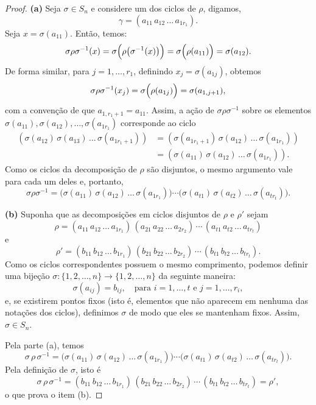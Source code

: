 \documentclass[11pt,openany]{book}
\begin{document}
\begin{proof}
    \textbf{(a)} Seja $\sigma\in S_n$ e considere um dos ciclos de $\rho$, digamos,
    \[
    \gamma=(a_{11}\,a_{12}\,\dots\,a_{1r_1}).
    \]
    Seja $x=\sigma(a_{11})$. Então, temos:
    \[
    \sigma\rho\sigma^{-1}(x)=\sigma\Bigl(\rho\bigl(\sigma^{-1}(x)\bigr)\Bigr)=\sigma\Bigl(\rho(a_{11})\Bigr)=\sigma(a_{12}).
    \]
    De forma similar, para $j=1,\dots,r_1$, definindo $x_j=\sigma(a_{1j})$, obtemos
    \[
    \sigma\rho\sigma^{-1}(x_j)=\sigma\Bigl(\rho(a_{1j})\Bigr)=\sigma(a_{1,j+1}),
    \]
    com a convenção de que $a_{1,r_1+1}=a_{11}$. Assim, a ação de $\sigma\rho\sigma^{-1}$ sobre os elementos $\sigma(a_{11}),\sigma(a_{12}),\dots,\sigma(a_{1r_1})$ corresponde ao ciclo
    \begin{align*}
    (\sigma(a_{12})\,\sigma(a_{13})\,\dots\,\sigma(a_{1r_1+1})) &= (\sigma(a_{1r_1+1})\, \sigma(a_{12})\,\dots\,\sigma(a_{1r_1})) \\
    &= (\sigma(a_{11})\,\sigma(a_{12})\,\dots\,\sigma(a_{1r_1})).
    \end{align*}
    Como os ciclos da decomposição de $\rho$ são disjuntos, o mesmo argumento vale para cada um deles e, portanto,
    \[
    \sigma\rho\sigma^{-1} = \bigl(\sigma(a_{11})\,\sigma(a_{12})\,\dots\,\sigma(a_{1r_1})\bigr)
    \cdots
    \bigl(\sigma(a_{t1})\,\sigma(a_{t2})\,\dots\,\sigma(a_{tr_t})\bigr).
    \]

    \bigskip

    \textbf{(b)} Suponha que as decomposições em ciclos disjuntos de $\rho$ e $\rho'$ sejam
    \[
    \rho = (a_{11}\,a_{12}\,\dots\,a_{1r_1})\,(a_{21}\,a_{22}\,\dots\,a_{2r_2})\,\cdots\,(a_{t1}\,a_{t2}\,\dots\,a_{tr_t})
    \]
    e
    \[
    \rho' = (b_{11}\,b_{12}\,\dots\,b_{1r_1})\,(b_{21}\,b_{22}\,\dots\,b_{2r_2})\,\cdots\,(b_{t1}\,b_{t2}\,\dots\,b_{tr_t}).
    \]
    Como os ciclos correspondentes possuem o mesmo comprimento, podemos definir uma bijeção $\sigma:\{1,2,\dots,n\}\to\{1,2,\dots,n\}$ da seguinte maneira:
    \[
    \sigma(a_{ij})=b_{ij},\quad \text{para } i=1,\dots,t \text{ e } j=1,\dots,r_i,
    \]
    e, se existirem pontos fixos (isto é, elementos que não aparecem em nenhuma das notações dos ciclos), definimos $\sigma$ de modo que eles se mantenham fixos. Assim, $\sigma\in S_n$.

    Pela parte (a), temos
    \[
    \sigma\,\rho\,\sigma^{-1} = \bigl(\sigma(a_{11})\,\sigma(a_{12})\,\dots\,\sigma(a_{1r_1})\bigr)
    \cdots
    \bigl(\sigma(a_{t1})\,\sigma(a_{t2})\,\dots\,\sigma(a_{tr_t})\bigr).
    \]
    Pela definição de $\sigma$, isto é
    \[
    \sigma\,\rho\,\sigma^{-1} = (b_{11}\,b_{12}\,\dots\,b_{1r_1})\,(b_{21}\,b_{22}\,\dots\,b_{2r_2})\,\cdots\,(b_{t1}\,b_{t2}\,\dots\,b_{tr_t}) = \rho',
    \]
    o que prova o item (b).


\end{proof}
\end{document}
